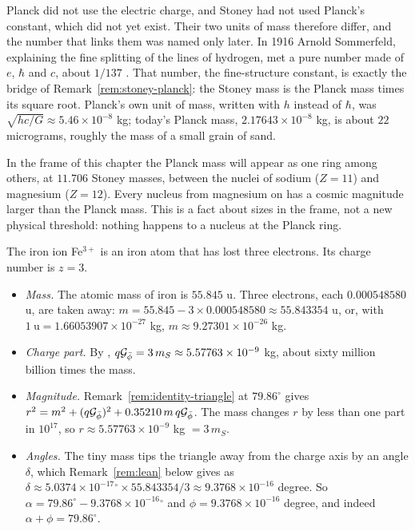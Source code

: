 Planck did not use the electric charge, and Stoney had not used Planck's constant, which did not yet exist. Their two units of mass therefore differ, and the number that links them was named only later. In 1916 Arnold Sommerfeld, explaining the fine splitting of the lines of hydrogen, met a pure number made of $e$, $\hbar$ and $c$, about $1/137$ \citep{Sommerfeld1916}. That number, the fine-structure constant, is exactly the bridge of Remark~\ref{rem:stoney-planck}: the Stoney mass is the Planck mass times its square root. Planck's own unit of mass, written with $h$ instead of $\hbar$, was $\sqrt{hc/G} \approx 5.46 \times 10^{-8}$ kg; today's Planck mass, $2.17643 \times 10^{-8}$ kg, is about $22$ micrograms, roughly the mass of a small grain of sand.

In the frame of this chapter the Planck mass will appear as one ring among others, at $11.706$ Stoney masses, between the nuclei of sodium ($Z = 11$) and magnesium ($Z = 12$). Every nucleus from magnesium on has a cosmic magnitude larger than the Planck mass. This is a fact about sizes in the frame, not a new physical threshold: nothing happens to a nucleus at the Planck ring.

\begin{workedexample}
The iron ion Fe$^{3+}$ is an iron atom that has lost three electrons. Its charge number is $z = 3$.
\begin{itemize}
  \item \emph{Mass.} The atomic mass of iron is $55.845$ u. Three electrons, each $0.000548580$ u, are taken away: $m = 55.845 - 3 \times 0.000548580 \approx 55.843354$ u, or, with $1\ \mathrm{u} = 1.66053907 \times 10^{-27}$ kg, $m \approx 9.27301 \times 10^{-26}$ kg.
  \item \emph{Charge part.} By , $q\mathcal{G}_{\bar{\phi}} = 3\,m_S \approx 5.57763 \times 10^{-9}$ kg, about sixty million billion times the mass.
  \item \emph{Magnitude.} Remark~\ref{rem:identity-triangle} at $79.86^\circ$ gives $r^2 = m^2 + (q\mathcal{G}_{\bar{\phi}})^2 + 0.35210\,m\,q\mathcal{G}_{\bar{\phi}}$. The mass changes $r$ by less than one part in $10^{17}$, so $r \approx 5.57763 \times 10^{-9}$ kg $= 3\,m_S$.
  \item \emph{Angles.} The tiny mass tips the triangle away from the charge axis by an angle $\delta$, which Remark~\ref{rem:lean} below gives as $\delta \approx 5.0374 \times 10^{-17}{}^\circ \times 55.843354/3 \approx 9.3768 \times 10^{-16}$ degree. So $\alpha = 79.86^\circ - 9.3768 \times 10^{-16}{}^\circ$ and $\phi = 9.3768 \times 10^{-16}$ degree, and indeed $\alpha + \phi = 79.86^\circ$.
\end{itemize}
\end{workedexample}

